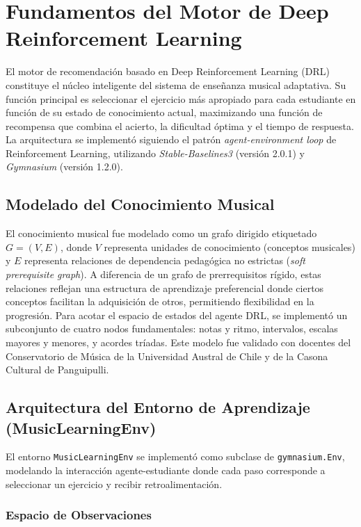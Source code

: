 \section{Fundamentos del Motor de Deep Reinforcement Learning}

El motor de recomendación basado en Deep Reinforcement Learning (DRL) constituye el núcleo inteligente del sistema de enseñanza musical adaptativa. Su función principal es seleccionar el ejercicio más apropiado para cada estudiante en función de su estado de conocimiento actual, maximizando una función de recompensa que combina el acierto, la dificultad óptima y el tiempo de respuesta. La arquitectura se implementó siguiendo el patrón \textit{agent-environment loop} de Reinforcement Learning, utilizando \textit{Stable-Baselines3} (versión 2.0.1) y \textit{Gymnasium} (versión 1.2.0).

\subsection{Modelado del Conocimiento Musical}

El conocimiento musical fue modelado como un grafo dirigido etiquetado $G = (V, E)$, donde $V$ representa unidades de conocimiento (conceptos musicales) y $E$ representa relaciones de dependencia pedagógica no estrictas (\textit{soft prerequisite graph}). A diferencia de un grafo de prerrequisitos rígido, estas relaciones reflejan una estructura de aprendizaje preferencial donde ciertos conceptos facilitan la adquisición de otros, permitiendo flexibilidad en la progresión. Para acotar el espacio de estados del agente DRL, se implementó un subconjunto de cuatro nodos fundamentales: notas y ritmo, intervalos, escalas mayores y menores, y acordes tríadas. Este modelo fue validado con docentes del Conservatorio de Música de la Universidad Austral de Chile y de la Casona Cultural de Panguipulli.

\subsection{Arquitectura del Entorno de Aprendizaje (MusicLearningEnv)}

El entorno \texttt{MusicLearningEnv} se implementó como subclase de \texttt{gymnasium.Env}, modelando la interacción agente-estudiante donde cada paso corresponde a seleccionar un ejercicio y recibir retroalimentación.

\subsubsection{Espacio de Observaciones}

